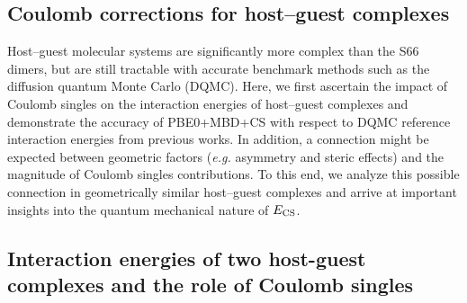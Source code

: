 \documentclass[aps,prl,groupaddress, twocolumn]{revtex4-1}  %
\begin{document}

\subsection*{Coulomb corrections for host--guest complexes}

Host--guest molecular systems are significantly more complex than the S66 dimers, but are still tractable with accurate benchmark methods such as the diffusion quantum Monte Carlo (DQMC). Here, we first ascertain the impact of Coulomb singles on the interaction energies of host--guest complexes and demonstrate the accuracy of PBE0+MBD+CS with respect to DQMC reference interaction energies from previous works. In addition, a connection might be expected between geometric factors (\textit{e.g.} asymmetry and steric effects) and the magnitude of Coulomb singles contributions. To this end, we analyze this possible connection in geometrically similar host--guest complexes and arrive at important insights into the quantum mechanical nature of $E_{\rm CS}$.

\subsection*{Interaction energies of two host-guest complexes and the role of Coulomb singles}
\end{document}
